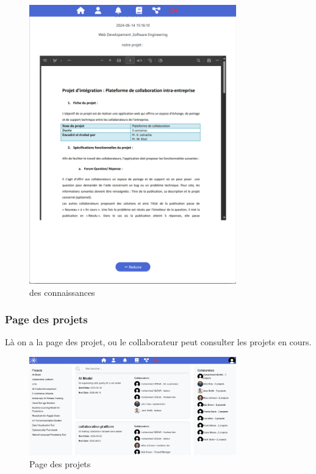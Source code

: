 \documentclass{article}
\begin{document}
                \begin{figure}[h!]
                    \centering
                    \includegraphics[width=0.8\textwidth]{assets/webSite/base-de-connaissance_demo.png}
                    \caption{des connaissances}
                \end{figure}
                \FloatBarrier
            \subsubsection{Page des projets}
                Là on a la page des projet, ou le collaborateur peut consulter les projets en cours.
                \begin{figure}[h!]
                    \centering
                    \includegraphics[width=0.8\textwidth]{assets/webSite/projectsPage.png}
                    \caption{Page des projets}
                \end{figure}
                \FloatBarrier
\end{document}
